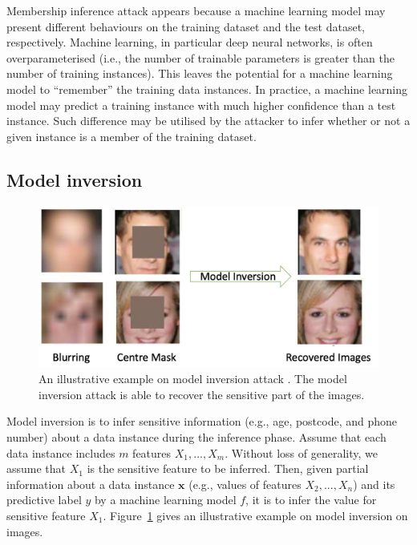 Membership inference attack appears because a machine learning model may present different behaviours on the training dataset and the test dataset, respectively. Machine learning, in particular deep neural networks, is often overparameterised (i.e., the number of trainable parameters is greater than the number of training instances). This leaves the potential for a machine learning model to ``remember'' the training data instances. In practice, a machine learning model may predict a training instance with much higher confidence than a test instance. Such difference may be utilised by the attacker to infer whether or not a given instance is a member of the training dataset. 

\subsection*{Model inversion} 

\begin{figure}[ht] 
 \center
    \includegraphics[width=0.8\linewidth]{images/foundations/ModelInversionImage.png} 
  \caption{An illustrative example on model inversion attack \cite{DBLP:journals/corr/abs-1911-07135}. The model inversion attack is able to recover the sensitive part of the images.}
  \label{model_inversion_image} 
\end{figure}

Model inversion is to infer sensitive information (e.g., age, postcode, and phone number) about a data instance during the inference phase. Assume that each data instance includes $m$ features $X_1,...,X_m$. Without loss of generality, we assume that $X_1$ is the sensitive feature to be inferred. Then, given partial information about  a data instance $\textbf{x}$   (e.g., values of features $X_2,...,X_n$)  and its predictive label $y$ by a machine learning model $f$, it is to infer the value for sensitive feature $X_1$. Figure~\ref{model_inversion_image} gives an illustrative example on model inversion on images. 

